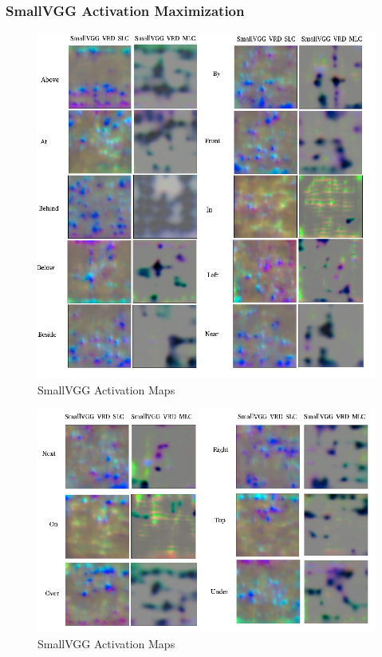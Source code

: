 \documentclass{csfyp}
\begin{document}
\subsubsection{SmallVGG Activation Maximization}

\begin{figure}[!htbp]
	\includegraphics[scale=0.60,center]{SmallVGG_VRD.pdf}
	\caption{SmallVGG Activation Maps}
\end{figure}

\begin{figure}[!htbp]
	\includegraphics[scale=0.60,center]{Small_VRD_2.pdf}
	\caption{SmallVGG Activation Maps}
\end{figure}
\end{document}
